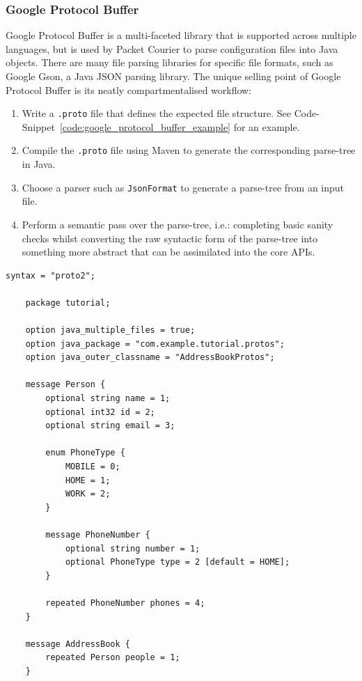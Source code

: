 \subsubsection{Google Protocol Buffer}

Google Protocol Buffer\cite{google_protobuf} is a multi-faceted library that is supported across multiple languages,
but is used by Packet Courier to parse configuration files into Java objects. There are many file parsing libraries
for specific file formats, such as Google Gson, a Java JSON parsing library\cite{google_gson}. The unique selling
point of Google Protocol Buffer is its neatly compartmentalised workflow:
\begin{enumerate}
    \item Write a \texttt{.proto} file that defines the expected file structure. See
    Code-Snippet~\ref{code:google_protocol_buffer_example} for an example.
    \item Compile the \texttt{.proto} file using Maven to generate the corresponding parse-tree in Java.
    \item Choose a parser such as \texttt{JsonFormat} to generate a parse-tree from an input file.
    \item Perform a semantic pass over the parse-tree, i.e.: completing basic sanity checks whilst converting the
    raw syntactic form of the parse-tree into something more abstract that can be assimilated into the core APIs.
\end{enumerate}

\begin{lstlisting}[language=protobuf2,style=protobuf,caption={An example of a \texttt{.proto} file that encodes for
an \texttt{AddressBook}. A data file that followed this syntactic structure could then be read into memory as an
\texttt{AddressBookProtos} Java class, ready for further abstraction.},
    label={code:google_protocol_buffer_example},captionpos=b]
    syntax = "proto2";

    package tutorial;

    option java_multiple_files = true;
    option java_package = "com.example.tutorial.protos";
    option java_outer_classname = "AddressBookProtos";

    message Person {
        optional string name = 1;
        optional int32 id = 2;
        optional string email = 3;

        enum PhoneType {
            MOBILE = 0;
            HOME = 1;
            WORK = 2;
        }

        message PhoneNumber {
            optional string number = 1;
            optional PhoneType type = 2 [default = HOME];
        }

        repeated PhoneNumber phones = 4;
    }

    message AddressBook {
        repeated Person people = 1;
    }
\end{lstlisting}

